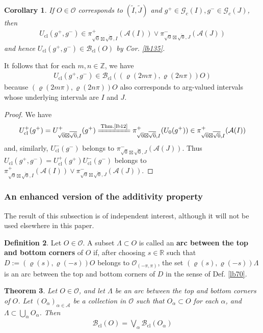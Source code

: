 \documentclass[11pt,b5paper,notitlepage]{article}
\theoremstyle{definition}
\newtheorem{df}{Definition}[section]
\theoremstyle{plain}
\newtheorem{thm}[df]{Theorem}
\newtheorem{co}[df]{Corollary}
\newcommand{\wtd}{\widetilde}
\newcommand{\ovl}{\overline}
\newcommand{\scr}{\mathscr}
\newcommand{\Zbb}{\mathbb Z}
\newcommand{\Rbb}{\mathbb R}
\newcommand{\Gc}{\mathscr G_c}
\newcommand{\cl}{\mathrm{cl}}
\newcommand{\MA}{\mathcal A}
\newcommand{\MO}{\mathcal O}
\newcommand{\sqz}{{\sqrt 0}}
\newcommand{\Bcl}{\mathcal B_{\mathrm{cl}}}
\newcommand{\Opp}{\mathcal O_{(-\pi,\pi)}}
\newcommand{\Ucl}{U_{\mathrm{cl}}}
\numberwithin{equation}{section}
\begin{document}
\begin{co}\label{lb99}
If $O\in\MO$ corresponds to $(\wtd I,\wtd J)$ and $g^+\in\Gc(I),g^-\in\Gc(J)$, then 
\begin{align*}
\Ucl(g^+,g^-)\in \pi^+_{\sqz\boxtimes\ovl\sqz,I}(\MA(I))\vee \pi^-_{\sqz\boxtimes\ovl\sqz,J}(\MA(J))
\end{align*}
and hence $\Ucl(g^+,g^-)\in\Bcl(O)$ by Cor. \ref{lb135}. 
\end{co}

It follows that for each $m,n\in\Zbb$, we have
\begin{align}
\Ucl(g^+,g^-)\in\Bcl((\varrho(2m\pi),\varrho(2n\pi))O)
\end{align}
because $(\varrho(2m\pi),\varrho(2n\pi))O$ also corresponds to arg-valued intervals whose underlying intervals are $I$ and $J$. 


\begin{proof}
We have
\begin{align*}
\Ucl^+(g^+)=U^+_{\sqz\boxtimes\ovl\sqz,I}(g^+)\xlongequal{\text{Thm.\ref{lb12}}}\pi^+_{\sqz\boxtimes\ovl\sqz,I}(U_0(g^+))\in\pi^+_{\sqz\boxtimes\ovl\sqz,I}(\MA(I))
\end{align*}
and, similarly, $\Ucl^-(g^-)$ belongs to $\pi^-_{\sqz\boxtimes\ovl\sqz,J}(\MA(J))$. Thus $U_\cl(g^+,g^-)=\Ucl^+(g^+)\Ucl^-(g^-)$ belongs to $\pi^+_{\sqz\boxtimes\ovl\sqz,I}(\MA(I))\vee\pi^-_{\sqz\boxtimes\ovl\sqz,J}(\MA(J))$.
\end{proof}


\subsubsection{An enhanced version of the additivity property}

The result of this subsection is of independent interest, although it will not be used elsewhere in this paper.

\begin{df}
Let $O\in\MO$. A subset $\Lambda\subset O$ is called an \textbf{arc between the top and bottom corners} of $O$ if, after choosing $s\in\Rbb$ such that $D:=(\varrho(s),\varrho(-s))O$ belongs to $\Opp$, the set $(\varrho(s),\varrho(-s))\Lambda$ is an arc between the top and bottom corners of $D$ in the sense of Def. \ref{lb70}.
\end{df}


\begin{thm}\label{lb146}
Let $O\in\MO$, and let $\Lambda$ be an arc between the top and bottom corners of $O$. Let $(O_\alpha)_{\alpha\in\scr A}$ be a collection in $\MO$ such that $O_\alpha\subset O$ for each $\alpha$, and $\Lambda\subset\bigcup_\alpha O_\alpha$. Then
\begin{align}
\Bcl(O)=\bigvee_\alpha\Bcl(O_\alpha)
\end{align}
\end{thm}
\end{document}
